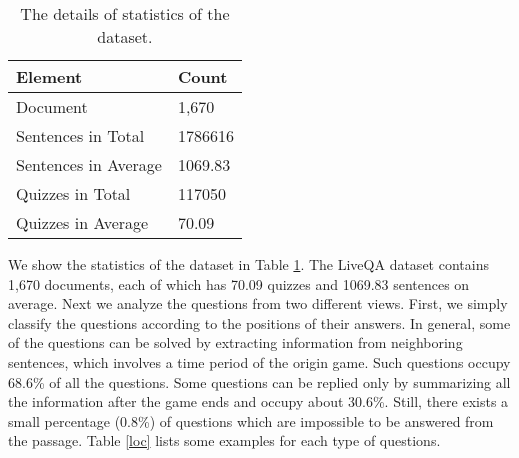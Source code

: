 \begin{table}[h]
\begin{center}
\begin{tabular}{ll}
\hline
\bf Element                              & \bf Count        \\
\hline
Document                          & 1,670 \\
Sentences in Total & 1786616\\
Sentences in Average & 1069.83\\
Quizzes in Total& 117050\\
Quizzes in Average                         & 70.09 \\

\hline
\end{tabular}
\end{center}
\caption{\label{stat} The details of statistics of the dataset.}
\end{table}

We show the statistics of the dataset in Table \ref{stat}. The LiveQA dataset contains 1,670 documents, each of which has 70.09 quizzes and 1069.83 sentences on average. 
Next we analyze the questions from two different views.
First, we simply classify the questions according to the positions of their answers. 
In general, some of the questions can be solved by extracting information from neighboring sentences, which involves a time period of the origin game. Such questions occupy
68.6\% of all the questions. Some questions can be replied only by summarizing all the information after the game ends and occupy about 30.6\%. Still, there exists a small percentage (0.8\%) of questions which are impossible to be answered from the passage.
Table \ref{loc} lists some examples for each type of questions. 

